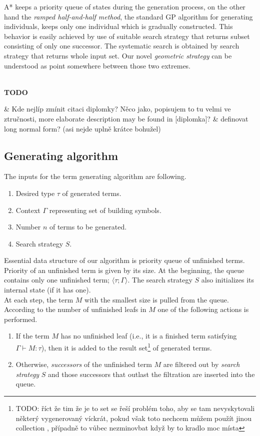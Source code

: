 \documentclass{llncs}
\newcommand{\tur}[3]{#1\vdash{}#2 \colon #3}
\newenvironment{todo}
{~\\ {\color{red}\textbf{TODO}}
  \begin{easylist}[itemize]}
{ \end{easylist}}
\newcommand{\ul}[2]{\langle #1 ; #2 \rangle}
\newcommand{\tom}[1]{{\color{ForestGreen} #1}}
\begin{document}
{A* keeps a priority queue of states during the generation process,
on the other hand the \textit{ramped half-and-half method}, 
the standard GP algorithm for generating individuals, 
keeps only one individual which is gradually constructed. This 
behavior is easily achieved by use of suitable search strategy 
that returns subset consisting of only one successor.
The systematic search is obtained by search strategy that 
returns whole input set.      
Our novel \textit{geometric strategy} can be understood as
point somewhere between those two extremes.
}

\begin{todo}
& \tom{Kde nejlíp zmínit citaci diplomky? Něco jako, popisujem to tu velmi ve ztručnosti,
  more elaborate description may be found in [diplomka]?}
& \tom{definovat long normal form? (asi nejde uplně krátce bohužel)}
\end{todo}

 

\subsection{Generating algorithm}

The inputs for the term generating algorithm are following.
\begin{enumerate}
 \item Desired type $\tau$ of generated terms.
 \item Context $\Gamma$ representing set of building symbols.
 \item Number $n$ of terms to be generated.
 \item Search strategy $S$. 
\end{enumerate}

Essential data structure of our algorithm 
is priority queue of unfinished terms. 
Priority of an unfinished term is given by its size.
At the beginning, the queue contains only one unfinished term; 
$\ul{\tau}{\Gamma}$. The search strategy $S$ also 
initializes its internal state (if it has one).\\

At each step, the term $M$ with the smallest size
is pulled from the queue.
According to the number of unfinished leafs in $M$ one of
the following actions is performed.
\begin{enumerate}
 \item If the term $M$ has no unfinished leaf (i.e., it is a finished
 term satisfying \mbox{$\tur{\Gamma}{M}{\tau}$}), then it is added to the
 result set\footnote{
 TODO: říct že tim že je to set se řeší problém toho, aby se tam nevyskytovali
 některý vygenerovaný víckrát, pokud však toto nechcem můžem použít jinou collection
 , případně to vůbec nezminovbat když by to kradlo moc místa
 } of generated terms.   
 \item Otherwise, \textit{successors} of the unfinished term $M$ are
       filtered out by \textit{search strategy} $S$ and
       those successors that outlast the filtration 
       are inserted into the queue.
\end{enumerate}
\end{document}
